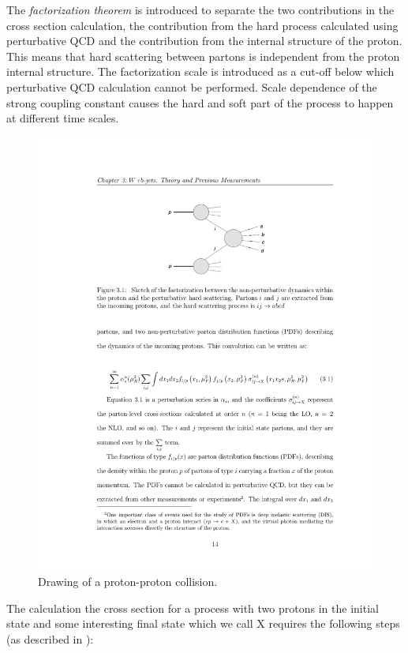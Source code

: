 	\par The \textit{ factorization theorem} is introduced to separate the two contributions in the cross section calculation, the contribution from the hard process calculated using perturbative QCD and the contribution from the internal structure of the proton. This means that hard scattering between partons is independent from the proton internal structure. The factorization scale is introduced as a cut-off below which perturbative QCD calculation cannot be performed.  Scale dependence of the strong coupling constant causes the hard and soft part of the process to happen at different time scales. 
	\begin{figure}[htbp]
	\centering
		\includegraphics{Figures/diagram.pdf}
	\caption[Drawing of a proton-proton collision]{Drawing of a proton-proton collision.}
	\label{fig:pp_drawing}
\end{figure}
The calculation the cross section for a process with two protons in the initial state and some interesting final state which we call X requires the following steps (as described in \cite{Campbell:2006wx}):
